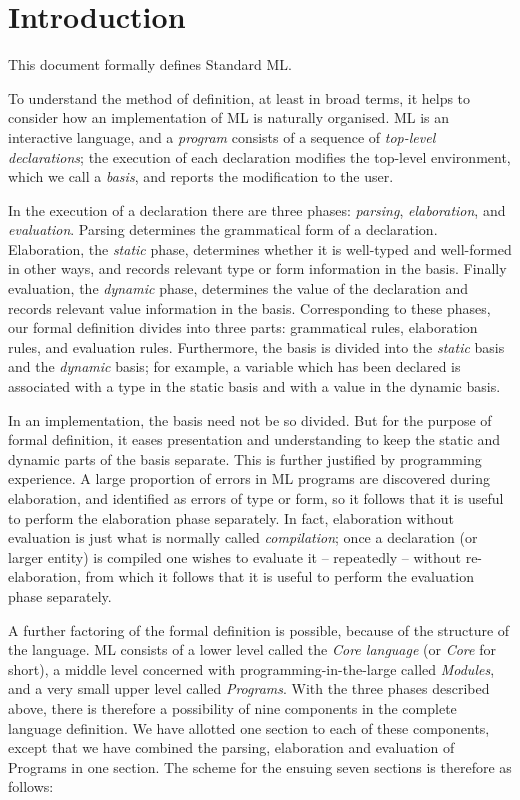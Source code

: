 \section{Introduction}

This document formally defines Standard ML.

To understand the method of definition, at least in broad terms, it helps to
consider how an implementation of ML is naturally
organised.  ML is an interactive
language, 
and a {\sl program}  consists of a sequence of {\sl top-level
declarations}; the execution
of each declaration modifies the top-level environment, which we call
a {\sl basis}, and reports the modification to the user.

In the execution of a declaration there are three phases:
{\sl parsing}, {\sl elaboration}, and {\sl evaluation}.  
Parsing
determines the grammatical form of a declaration.  Elaboration, the
{\sl static} phase, determines whether it is well-typed and
well-formed in other ways, and records relevant type or form information
in the basis. Finally evaluation, the {\sl dynamic} phase, determines the
value of the declaration and records relevant value information in the
basis.  Corresponding to these phases, our formal definition divides
into three parts:  grammatical rules, elaboration rules, and evaluation
rules.  Furthermore, the basis is divided into the {\sl static} 
basis and the {\sl dynamic} basis; for example, a variable which has been
declared is associated with a type in the static basis and with a value in
the dynamic basis.

In an implementation, the basis need not be so divided.  But for the
purpose of formal definition, it eases presentation and understanding to
keep the static and dynamic parts of the basis separate.
This is further justified by programming experience.  A large proportion
of errors in ML programs are discovered during elaboration, and identified
as errors of type or form, so it follows that it is useful to perform
the elaboration phase separately.  In fact, elaboration without
evaluation is just what is normally called {\sl compilation};  once
a declaration (or larger entity) is compiled one wishes to evaluate it --
repeatedly -- without re-elaboration, from which it follows that it is
useful to perform the evaluation phase separately.

A further factoring of the formal definition is possible,
because of the structure of the language.  ML consists of a lower level
called the {\sl Core language} (or {\sl Core} for short), a middle level
concerned  with programming-in-the-large called {\sl Modules},
and a very small upper level called {\sl Programs}.
With the three phases described above, there is therefore
a possibility of nine components in the
complete language definition. We have allotted one section to each
of these components, except that we have combined the parsing,
elaboration and evaluation of Programs in one section. The
scheme for the ensuing seven sections is therefore as follows:

